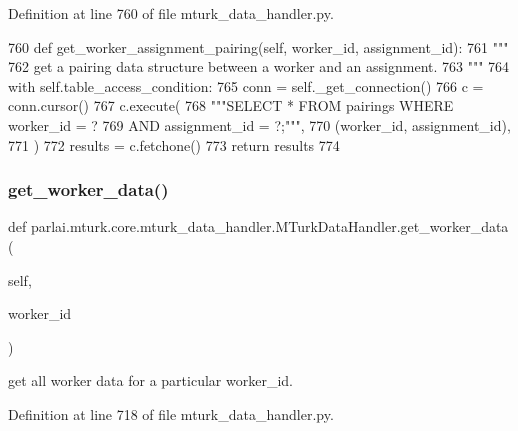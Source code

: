 Definition at line 760 of file mturk\+\_\+data\+\_\+handler.\+py.


\begin{DoxyCode}
760     \textcolor{keyword}{def }get\_worker\_assignment\_pairing(self, worker\_id, assignment\_id):
761         \textcolor{stringliteral}{"""}
762 \textcolor{stringliteral}{        get a pairing data structure between a worker and an assignment.}
763 \textcolor{stringliteral}{        """}
764         with self.table\_access\_condition:
765             conn = self.\_get\_connection()
766             c = conn.cursor()
767             c.execute(
768                 \textcolor{stringliteral}{"""SELECT * FROM pairings WHERE worker\_id = ?}
769 \textcolor{stringliteral}{                         AND assignment\_id = ?;"""},
770                 (worker\_id, assignment\_id),
771             )
772             results = c.fetchone()
773             \textcolor{keywordflow}{return} results
774 
\end{DoxyCode}
\mbox{\label{classparlai_1_1mturk_1_1core_1_1mturk__data__handler_1_1MTurkDataHandler_a45c012ee9fa36a52f9286ccc3ab1be3a}} 
\subsubsection{\texorpdfstring{get\+\_\+worker\+\_\+data()}{get\_worker\_data()}}
{\footnotesize\ttfamily def parlai.\+mturk.\+core.\+mturk\+\_\+data\+\_\+handler.\+M\+Turk\+Data\+Handler.\+get\+\_\+worker\+\_\+data (\begin{DoxyParamCaption}\item[{}]{self,  }\item[{}]{worker\+\_\+id }\end{DoxyParamCaption})}

\begin{DoxyVerb}get all worker data for a particular worker_id.
\end{DoxyVerb}
 

Definition at line 718 of file mturk\+\_\+data\+\_\+handler.\+py.


